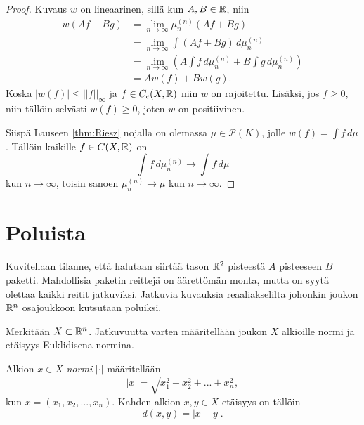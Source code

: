 \documentclass[12pt,oneside,a4paper]{amsbook} %
\begin{document}
\begin{proof}
    Kuvaus $w$ on lineaarinen, sillä kun $A, B \in \mathbb{R}$, niin
    \begin{align*}
        w(A f + B g) &= \lim_{n \to \infty} \mu_n^{(n)}(A f + B g) \\
        &=\lim_{n \to \infty} \int (A f + B g) \, d\mu_n^{(n)} \\
        &=\lim_{n \to \infty}  \left(A \int f \, d\mu_n^{(n)} + B \int g \, d\mu_n^{(n)}\right)  \\
        &= A w(f) + B w(g).
    \end{align*}
    Koska $|w(f)| \le ||f||_\infty$ ja $f \in C_c(X, \mathbb{R})$ niin $w$ on rajoitettu. Lisäksi, jos $f \ge 0$, niin tällöin selvästi $w(f) \ge 0$, joten $w$ on positiivinen.


    Siispä Lauseen \ref{thm:Riesz} nojalla on olemassa $\mu \in \mathcal P(K)$, jolle $w(f) = \int f \, d\mu$. Tällöin kaikille $f \in C(X, \mathbb{R})$ on
    \begin{equation*}
        \int f \, d\mu_n^{(n)} \to \int f \, d\mu
    \end{equation*}
    kun $n \to \infty$, toisin sanoen $\mu_n^{(n)} \to \mu$ kun $n \to \infty$.
\end{proof}


\section{Poluista}
Kuvitellaan tilanne, että halutaan siirtää tason $\mathbb{R}^2$ pisteestä $A$ pisteeseen $B$ paketti. Mahdollisia paketin reittejä on äärettömän monta, mutta on syytä olettaa kaikki reitit jatkuviksi. Jatkuvia kuvauksia reaaliakselilta johonkin joukon $\mathbb{R}^n$ osajoukkoon kutsutaan poluiksi. 

Merkitään $X \subset \mathbb{R}^n$. Jatkuvuutta varten määritellään joukon $X$ alkioille normi ja etäisyys Euklidisena normina.
\begin{definition}
    Alkion $x \in X$ \textit{normi} $|\cdot|$ määritellään
    \begin{equation*}
        |x| = \sqrt{x_1^2 + x_2^2 + ... + x_n^2},
    \end{equation*}
    kun $x = (x_1, x_2, ... , x_n)$. Kahden alkion $x, y \in X$ etäisyys on tällöin
    \begin{equation*}
        d(x, y) = |x - y|.
    \end{equation*}
\end{definition}
\end{document}
